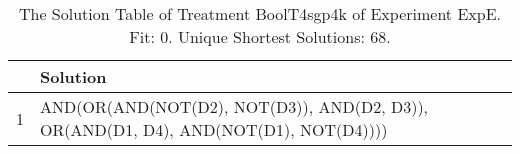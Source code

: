 \begin{table}[ht]
\centering
\begin{tabular}{rp{9cm}}
  \hline
 & Solution \\ 
  \hline
1 & AND(OR(AND(NOT(D2), NOT(D3)), AND(D2, D3)), OR(AND(D1, D4), AND(NOT(D1), NOT(D4)))) \\ 
   \hline
\end{tabular}
\caption{The Solution Table of Treatment BoolT4sgp4k of Experiment ExpE. Fit: 0. Unique Shortest Solutions: 68.} 
\end{table}
